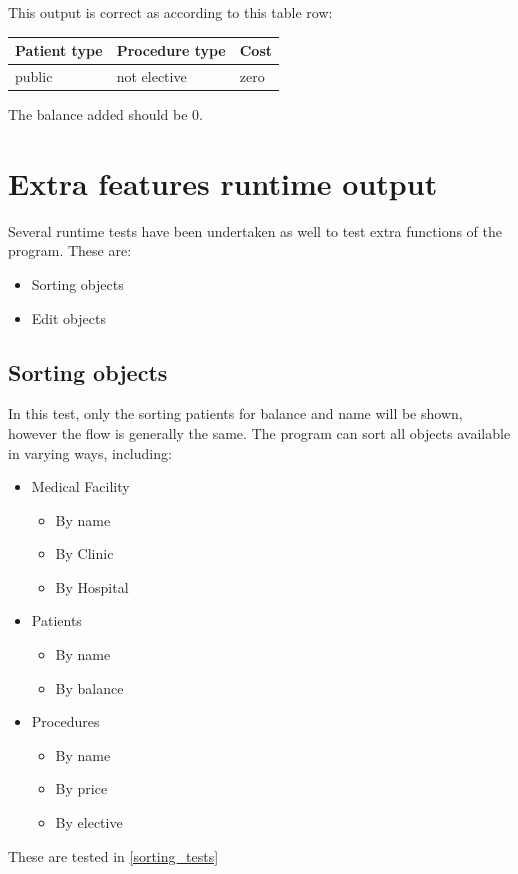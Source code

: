 \documentclass{article}
\begin{document}
	This output is correct as according to this table row: 
	\begin{table}
		\begin{center}
			\begin{tabular}[c]{l|l|l}
				\hline
				\multicolumn{1}{c|}{\textbf{Patient type}} & 
				\multicolumn{1}{c}{\textbf{Procedure type}} & 
				\multicolumn{1}{c}{\textbf{Cost}} \\
				\hline
				public & not elective & zero \\
				\hline
			\end{tabular}
		\end{center}
	\end{table}

	The balance added should be $0$.

	\newpage

	\section{Extra features runtime output}\label{sec:extra_features_runtime_output} %
	Several runtime tests have been undertaken as well to test extra functions of the program. These are:
	\begin{itemize}
		\item Sorting objects 
		\item Edit objects
	\end{itemize}

	\subsection{Sorting objects}\label{sub:sorting_objects} %
	In this test, only the sorting patients for balance and name will be shown, however the flow is generally the same. The program can sort all objects available in varying ways, including: 
	\begin{itemize}
		\item Medical Facility 
		\begin{itemize}
			\item By name 
			\item By Clinic
			\item By Hospital
		\end{itemize}
		\item Patients
		\begin{itemize}
			\item By name
			\item By balance
		\end{itemize}
		\item Procedures 
		\begin{itemize}
			\item By name 
			\item By price 
			\item By elective
		\end{itemize}
	\end{itemize}
	These are tested in \ref{sorting_tests}
\end{document}
